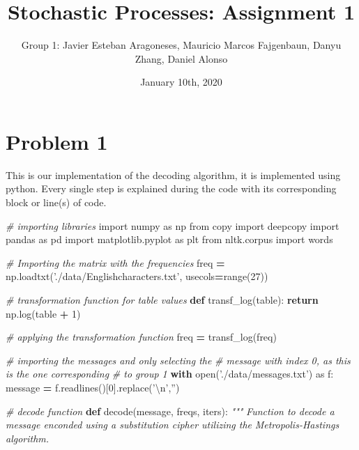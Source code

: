 \documentclass[]{article}
\title{Stochastic Processes: Assignment 1}
\author{Group 1: Javier Esteban Aragoneses, Mauricio Marcos Fajgenbaun, Danyu
Zhang, Daniel Alonso}
\date{January 10th, 2020}
\newenvironment{Shaded}{\begin{snugshade}}{\end{snugshade}}
\newcommand{\BuiltInTok}[1]{#1}
\newcommand{\CharTok}[1]{\textcolor[rgb]{0.31,0.60,0.02}{#1}}
\newcommand{\CommentTok}[1]{\textcolor[rgb]{0.56,0.35,0.01}{\textit{#1}}}
\newcommand{\ControlFlowTok}[1]{\textcolor[rgb]{0.13,0.29,0.53}{\textbf{#1}}}
\newcommand{\DecValTok}[1]{\textcolor[rgb]{0.00,0.00,0.81}{#1}}
\newcommand{\ImportTok}[1]{#1}
\newcommand{\KeywordTok}[1]{\textcolor[rgb]{0.13,0.29,0.53}{\textbf{#1}}}
\newcommand{\NormalTok}[1]{#1}
\newcommand{\OperatorTok}[1]{\textcolor[rgb]{0.81,0.36,0.00}{\textbf{#1}}}
\newcommand{\StringTok}[1]{\textcolor[rgb]{0.31,0.60,0.02}{#1}}
\begin{document}
\maketitle

\hypertarget{problem-1}{%
\section{Problem 1}\label{problem-1}}

This is our implementation of the decoding algorithm, it is implemented
using python. Every single step is explained during the code with its
corresponding block or line(s) of code.

\begin{Shaded}
\begin{Highlighting}[]
\CommentTok{# importing libraries}
\ImportTok{import}\NormalTok{ numpy }\ImportTok{as}\NormalTok{ np}
\ImportTok{from}\NormalTok{ copy }\ImportTok{import}\NormalTok{ deepcopy}
\ImportTok{import}\NormalTok{ pandas }\ImportTok{as}\NormalTok{ pd}
\ImportTok{import}\NormalTok{ matplotlib.pyplot }\ImportTok{as}\NormalTok{ plt}
\ImportTok{from}\NormalTok{ nltk.corpus }\ImportTok{import}\NormalTok{ words}

\CommentTok{# Importing the matrix with the frequencies}
\NormalTok{freq }\OperatorTok{=}\NormalTok{  np.loadtxt(}\StringTok{'./data/Englishcharacters.txt'}\NormalTok{, usecols}\OperatorTok{=}\BuiltInTok{range}\NormalTok{(}\DecValTok{27}\NormalTok{))}

\CommentTok{# transformation function for table values}
\KeywordTok{def}\NormalTok{ transf_log(table):}
    \ControlFlowTok{return}\NormalTok{ np.log(table }\OperatorTok{+} \DecValTok{1}\NormalTok{)}

\CommentTok{# applying the transformation function}
\NormalTok{freq }\OperatorTok{=}\NormalTok{ transf_log(freq)}

\CommentTok{# importing the messages and only selecting the }
\CommentTok{# message with index 0, as this is the one corresponding}
\CommentTok{# to group 1}
\ControlFlowTok{with} \BuiltInTok{open}\NormalTok{(}\StringTok{'./data/messages.txt'}\NormalTok{) }\ImportTok{as}\NormalTok{ f:}
\NormalTok{    message }\OperatorTok{=}\NormalTok{ f.readlines()[}\DecValTok{0}\NormalTok{].replace(}\StringTok{'}\CharTok{\textbackslash{}n}\StringTok{'}\NormalTok{,}\StringTok{''}\NormalTok{)}

\CommentTok{# decode function}
\KeywordTok{def}\NormalTok{ decode(message, freqs, iters):}
    \CommentTok{"""}
\CommentTok{    Function to decode a message enconded }
\CommentTok{    using a substitution cipher utilizing the}
\CommentTok{    Metropolis-Hastings algorithm.}


\end{Highlighting}
\end{Shaded}
\end{document}
